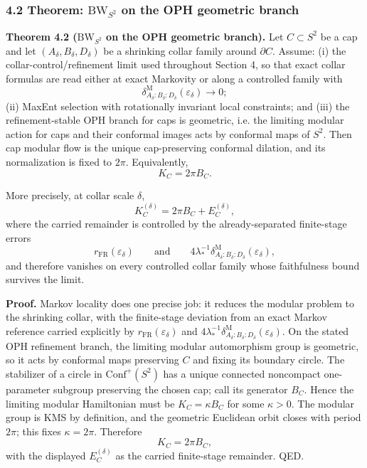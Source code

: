 \subsubsection{\texorpdfstring{4.2 Theorem: \(\mathrm{BW}_{S^2}\) on the OPH geometric branch}{4.2 Theorem: \textbackslash mathrm\{BW\}\_\{S\^{}2\} on the OPH geometric branch}}\label{42-theorem-mathrmbw_s2-from-markov-locality-symmetry-regularity}

\textbf{Theorem 4.2 (\(\mathrm{BW}_{S^2}\) on the OPH geometric branch).} Let \(C\subset S^2\) be a cap and let \((A_\delta,B_\delta,D_\delta)\) be a shrinking collar family around \(\partial C\). Assume: (i) the collar-control/refinement limit used throughout Section 4, so that exact collar formulas are read either at exact Markovity or along a controlled family with
\[
\delta^{\mathrm M}_{A_\delta:B_\delta:D_\delta}(\varepsilon_\delta)\to 0;
\]
(ii) MaxEnt selection with rotationally invariant local constraints; and (iii) the refinement-stable OPH branch for caps is geometric, i.e. the limiting modular action for caps and their conformal images acts by conformal maps of \(S^2\). Then cap modular flow is the unique cap-preserving conformal dilation, and its normalization is fixed to \(2\pi\). Equivalently,
\[
K_C=2\pi B_C.
\]

More precisely, at collar scale \(\delta\),
\[
K_C^{(\delta)}=2\pi B_C+E_C^{(\delta)},
\]
where the carried remainder is controlled by the already-separated finite-stage errors
\[
r_{\mathrm{FR}}(\varepsilon_\delta)
\qquad\text{and}\qquad
4\lambda_\ast^{-1}\delta^{\mathrm M}_{A_\delta:B_\delta:D_\delta}(\varepsilon_\delta),
\]
and therefore vanishes on every controlled collar family whose faithfulness bound survives the limit.

\textbf{Proof.} Markov locality does one precise job: it reduces the modular problem to the shrinking collar, with the finite-stage deviation from an exact Markov reference carried explicitly by \(r_{\mathrm{FR}}(\varepsilon_\delta)\) and \(4\lambda_\ast^{-1}\delta^{\mathrm M}_{A_\delta:B_\delta:D_\delta}(\varepsilon_\delta)\). On the stated OPH refinement branch, the limiting modular automorphism group is geometric, so it acts by conformal maps preserving \(C\) and fixing its boundary circle. The stabilizer of a circle in \(\mathrm{Conf}^+(S^2)\) has a unique connected noncompact one-parameter subgroup preserving the chosen cap; call its generator \(B_C\). Hence the limiting modular Hamiltonian must be \(K_C=\kappa B_C\) for some \(\kappa>0\). The modular group is KMS by definition, and the geometric Euclidean orbit closes with period \(2\pi\); this fixes \(\kappa=2\pi\). Therefore
\[
K_C=2\pi B_C,
\]
with the displayed \(E_C^{(\delta)}\) as the carried finite-stage remainder. QED.

